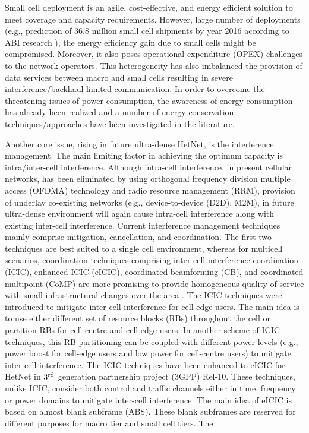 \documentclass[article,10pt,twocolumn]{IEEEtran}
\begin{document}
Small cell deployment is an agile, cost-effective, and energy efficient solution to meet coverage and capacity requirements. However, large number of deployments (e.g., prediction of 36.8 million small cell shipments by year 2016 according to ABI research \citep{ABI}), the energy efficiency gain due to small cells might be compromised. Moreover, it also poses operational expenditure (OPEX) challenges to the network operators. This heterogeneity has also imbalanced the provision of data services between macro and small cells resulting in severe interference/backhaul-limited communication. In order to overcome the threatening issues of power consumption, the awareness of energy consumption has already been realized and a number of energy conservation techniques/approaches have been investigated in the literature.

Another core issue, rising in future ultra-dense HetNet, is the interference management. The main limiting factor in achieving the optimum capacity is intra/inter-cell interference. Although intra-cell interference, in present cellular networks, has been eliminated by using orthogonal frequency division multiple access (OFDMA) technology and radio resource management (RRM), provision of underlay co-existing networks (e.g., device-to-device (D2D), M2M), in future ultra-dense environment will again cause intra-cell interference along with existing inter-cell interference. Current interference management techniques mainly comprise mitigation, cancellation, and coordination. The first two techniques are best suited to a single cell environment, whereas for multicell scenarios, coordination techniques comprising inter-cell interference coordination (ICIC), enhanced ICIC (eICIC), coordinated beamforming (CB), and coordinated multipoint (CoMP) are more promising to provide homogeneous quality of service with small infrastructural changes over the area \citep{4117538}. The ICIC techniques were introduced to mitigate inter-cell interference for cell-edge users. The main idea is to use either different set of resource blocks (RBs) throughout the cell or partition RBs for cell-centre and cell-edge users. In another scheme of ICIC techniques, this RB partitioning can be coupled with different power levels (e.g., power boost for cell-edge users and low power for cell-centre users) to mitigate inter-cell interference. The ICIC techniques have been enhanced to eICIC for HetNet in $3^{\textnormal{rd}}$ generation partnership project (3GPP)  Rel-10. These techniques, unlike ICIC, consider both control and traffic channels either in time, frequency or power domains to mitigate inter-cell interference. The main idea of eICIC is based on almost blank subframe (ABS). These blank subframes are reserved for different purposes for macro tier and  small cell tiers. The 
\end{document}
